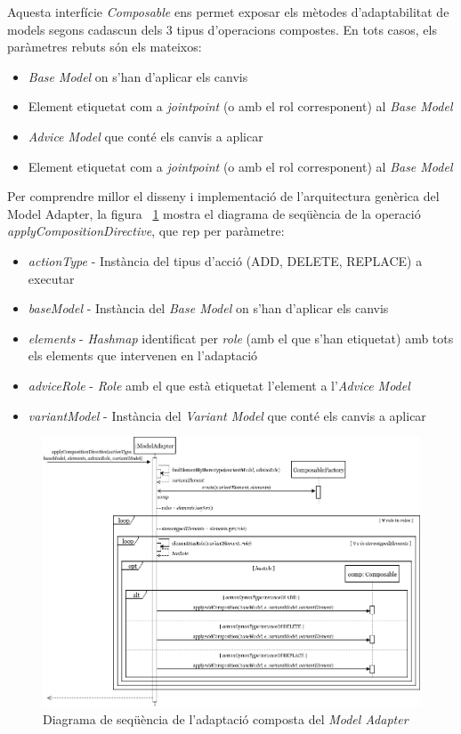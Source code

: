 Aquesta interfície \textit{Composable} ens permet exposar els mètodes d'adaptabilitat de models segons cadascun dels 3 tipus d'operacions compostes. En tots casos, els paràmetres rebuts són els mateixos:

\begin{itemize}
\item \textit{Base Model} on s'han d'aplicar els canvis
\item Element etiquetat com a \textit{jointpoint} (o amb el rol corresponent) al \textit{Base Model}
\item \textit{Advice Model} que conté els canvis a aplicar
\item Element etiquetat com a \textit{jointpoint} (o amb el rol corresponent) al \textit{Base Model}
\end{itemize}

Per comprendre millor el disseny i implementació de l'arquitectura genèrica del Model Adapter, la figura ~\ref{fig:Figura30} mostra el diagrama de seqüència de la operació \textit{applyCompositionDirective}, que rep per paràmetre:

\begin{itemize}
\item \textit{actionType} - Instància del tipus d'acció (ADD, DELETE, REPLACE) a executar
\item \textit{baseModel} - Instància del \textit{Base Model} on s'han d'aplicar els canvis
\item \textit{elements} - \textit{Hashmap} identificat per \textit{role} (amb el que s'han etiquetat) amb tots els elements que intervenen en l'adaptació
\item \textit{adviceRole} - \textit{Role} amb el que està etiquetat l'element a l'\textit{Advice Model}
\item \textit{variantModel} - Instància del \textit{Variant Model} que conté els canvis a aplicar
\end{itemize}

\begin{figure}
\centering
\includegraphics[width=14cm]{Figures/Figure30}
\decoRule
\caption{Diagrama de seqüència de l'adaptació composta del \textit{Model Adapter}}
\label{fig:Figura30}
\end{figure}

